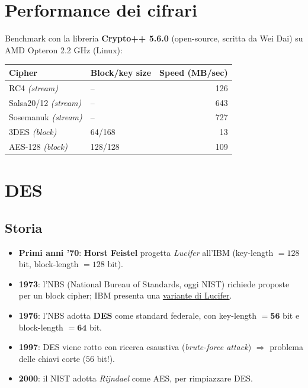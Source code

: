 \section{Performance dei cifrari}
Benchmark con la libreria \textbf{Crypto++ 5.6.0} (open-source, scritta da Wei Dai) su AMD Opteron 2.2 GHz (Linux):
\begin{center}
  \begin{tabular}{llr}
    \hline
    \textbf{Cipher} & \textbf{Block/key size} & \textbf{Speed (MB/sec)} \\
    \hline
    RC4 \textit{(stream)}        & --       & 126 \\
    Salsa20/12 \textit{(stream)} & --       & 643 \\
    Sosemanuk \textit{(stream)}  & --       & 727 \\
    3DES \textit{(block)}        & 64/168   & 13  \\
    AES-128 \textit{(block)}     & 128/128  & 109 \\
    \hline
  \end{tabular}
\end{center}

\section{DES}

\subsection{Storia}
\begin{itemize}
  \item \textbf{Primi anni '70}: \textbf{Horst Feistel} progetta \textit{Lucifer} all'IBM (key-length $ = 128 $ bit, block-length $ = 128 $ bit).
  \item \textbf{1973}: l'NBS (National Bureau of Standards, oggi NIST) richiede proposte per un block cipher; IBM presenta una \underline{variante di Lucifer}.
  \item \textbf{1976}: l'NBS adotta \textbf{DES} come standard federale, con key-length $ = \mathbf{56} $ bit e block-length $ = \mathbf{64} $ bit.
  \item \textbf{1997}: DES viene rotto con ricerca esaustiva (\textit{brute-force attack}) $ \Rightarrow $ problema delle chiavi corte ($ 56 $ bit!).
  \item \textbf{2000}: il NIST adotta \textit{Rijndael} come AES, per rimpiazzare DES.
\end{itemize}

